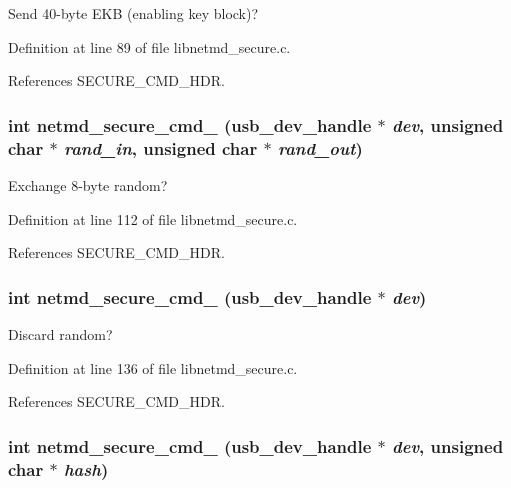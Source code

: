 Send 40-\/byte EKB (enabling key block)? 

Definition at line 89 of file libnetmd\_\-secure.c.

References SECURE\_\-CMD\_\-HDR.
\subsubsection[{netmd\_\-secure\_\-cmd\_\-20}]{\setlength{\rightskip}{0pt plus 5cm}int netmd\_\-secure\_\-cmd\_ (usb\_\-dev\_\-handle $\ast$ {\em dev}, \/  unsigned char $\ast$ {\em rand\_\-in}, \/  unsigned char $\ast$ {\em rand\_\-out})}\label{libnetmd__secure_8c_a9bf8c5df365bc57724e2243c3b6ac0c6}


Exchange 8-\/byte random? 

Definition at line 112 of file libnetmd\_\-secure.c.

References SECURE\_\-CMD\_\-HDR.
\subsubsection[{netmd\_\-secure\_\-cmd\_\-21}]{\setlength{\rightskip}{0pt plus 5cm}int netmd\_\-secure\_\-cmd\_ (usb\_\-dev\_\-handle $\ast$ {\em dev})}\label{libnetmd__secure_8c_a6b0725919833d9ee270de6858eacad95}


Discard random? 

Definition at line 136 of file libnetmd\_\-secure.c.

References SECURE\_\-CMD\_\-HDR.
\subsubsection[{netmd\_\-secure\_\-cmd\_\-22}]{\setlength{\rightskip}{0pt plus 5cm}int netmd\_\-secure\_\-cmd\_ (usb\_\-dev\_\-handle $\ast$ {\em dev}, \/  unsigned char $\ast$ {\em hash})}\label{libnetmd__secure_8c_a2b025fb79b938b9fb3fbea6de492dd60}


